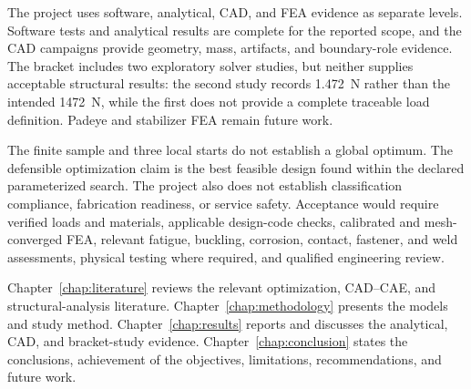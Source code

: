 The project uses software, analytical, CAD, and FEA evidence as separate
levels. Software tests and analytical results are complete for the reported
scope, and the CAD campaigns provide geometry, mass, artifacts, and
boundary-role evidence. The bracket includes two exploratory solver studies,
but neither supplies acceptable structural results: the second study records
1.472~N rather than the intended 1472~N, while the first does not provide a
complete traceable load definition. Padeye and stabilizer FEA remain future
work.

The finite sample and three local starts do not establish a global optimum.
The defensible optimization claim is the best feasible design found within
the declared parameterized search. The project also does not establish
classification compliance, fabrication readiness, or service safety.
Acceptance would require verified loads and materials, applicable design-code
checks, calibrated and mesh-converged FEA, relevant fatigue, buckling,
corrosion, contact, fastener, and weld assessments, physical testing where
required, and qualified engineering review.

\screeningwarning

Chapter~\ref{chap:literature} reviews the relevant optimization, CAD--CAE, and
structural-analysis literature. Chapter~\ref{chap:methodology} presents the
models and study method. Chapter~\ref{chap:results} reports and discusses the
analytical, CAD, and bracket-study evidence. Chapter~\ref{chap:conclusion}
states the conclusions, achievement of the objectives, limitations,
recommendations, and future work.
